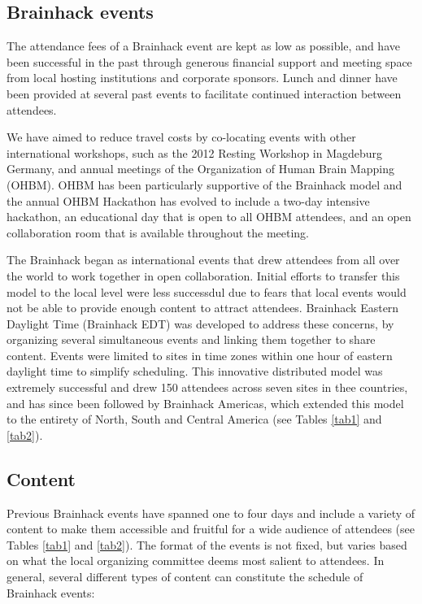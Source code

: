 \documentclass[11pt]{bmc_article_s50}
\begin{document}
\subsection{Brainhack events}

The attendance fees of a Brainhack event are kept as low as possible, and have been successful in the past through generous financial support and meeting space from local hosting institutions and corporate sponsors. Lunch and dinner have been provided at several past events to facilitate continued interaction between attendees. 

We have aimed to reduce travel costs by co-locating events with other international workshops, such as the 2012 Resting Workshop in Magdeburg Germany, and annual meetings of the Organization of Human Brain Mapping (OHBM). OHBM has been particularly supportive of the Brainhack model and the annual OHBM Hackathon has evolved to include a two-day intensive hackathon, an educational day that is open to all OHBM attendees, and an open collaboration room that is available throughout the meeting.

The Brainhack began as international events that drew attendees from all over the world to work together in open collaboration. Initial efforts to transfer this model to the local level were less successdul due to fears that local events would not be able to provide enough content to attract attendees. Brainhack Eastern Daylight Time (Brainhack EDT) was developed to address these concerns, by organizing several simultaneous events and linking them together to share content. Events were limited to sites in time zones within one hour of eastern daylight time to simplify scheduling. This innovative distributed model was extremely successful and drew 150 attendees across seven sites in thee countries, and has since been followed by Brainhack Americas, which extended this model to the entirety of North, South and Central America (see Tables \ref{tab1} and \ref{tab2}).


\subsection{Content}

Previous Brainhack events have spanned one to four days and include a variety of content to make them accessible and fruitful for a wide audience of attendees (see Tables \ref{tab1} and \ref{tab2}). The format of the events is not fixed, but varies based on what the local organizing committee deems most salient to attendees. In general, several different types of content can constitute the schedule of Brainhack events:
\end{document}
